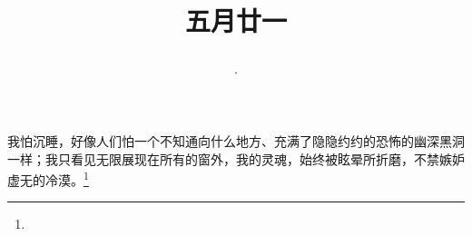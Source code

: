 \title{\date[d=26,m=6,y=2024][year:cn-y,年,month:cn,day:cn,日,·,weekday]·五月廿一 }
我怕沉睡，好像人们怕一个不知通向什么地方、充满了隐隐约约的恐怖的幽深黑洞一样；我只看见无限展现在所有的窗外，我的灵魂，始终被眩晕所折磨，不禁嫉妒虚无的冷漠。\footnote{ }

